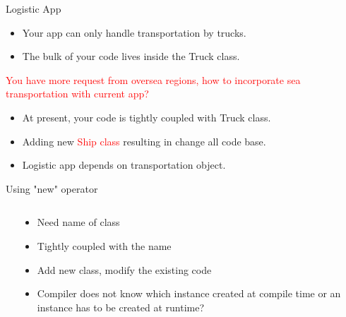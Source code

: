 \documentclass[13pt]{beamer}
\begin{document}
\begin{frame}{Logistic App}
	\begin{center}
	\end{center}
	\begin{itemize}
	\item Your app can only handle transportation by trucks.
	\item The bulk of your code lives inside the Truck class.
	\end{itemize}
	\begin{center}
	\textcolor{red}{You have more request from oversea regions, how to incorporate sea transportation with current app?}
	\end{center}
	\begin{itemize}
	\item At present, your code is tightly coupled with Truck class.
	\item Adding new \textcolor{red}{Ship class} resulting in change all code base.
	\item Logistic app depends on transportation object.
	\end{itemize}
\end{frame}

\begin{frame}{Using "new" operator}
\begin{columns}[T]
\begin{column}{.45\textwidth}
\lstset{basicstyle=\tiny,style=myCustomCppStyle}

\end{column}
\begin{column}{.48\textwidth}
	\begin{itemize}
		\setlength\itemsep{1em}
		\item Need name of class
		\item Tightly coupled with the name
		\item Add new class, modify the existing code
		\item Compiler does not know which instance created at compile time or an instance has to be created at runtime?
	\end{itemize}
\end{column}
\end{columns}
\end{frame}
\end{document}

